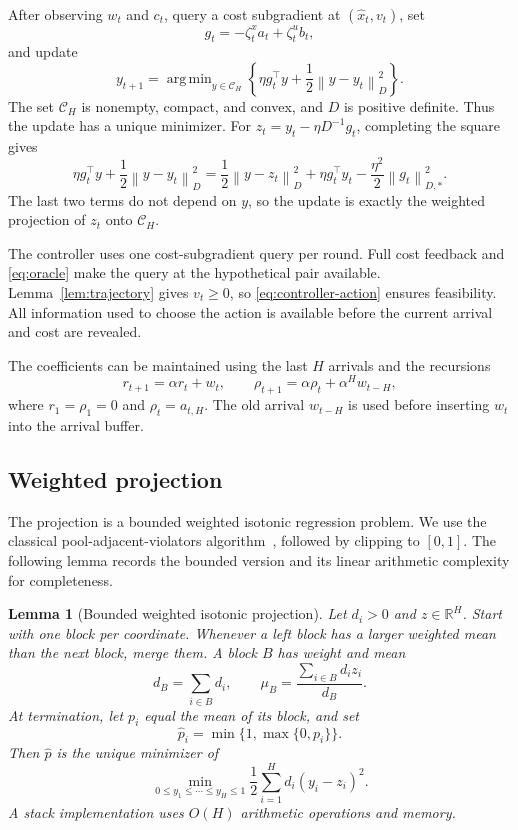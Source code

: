 \documentclass[11pt]{article}
\newtheorem{lemma}[theorem]{Lemma}
\newcommand{\R}{\mathbb R}
\newcommand{\CH}{\mathcal C_H}
\newcommand{\normD}[1]{\left\lVert #1\right\rVert_D}
\newcommand{\normDual}[1]{\left\lVert #1\right\rVert_{D,*}}
\DeclareMathOperator*{\argmin}{arg\,min}
\begin{document}
After observing $w_t$ and $c_t$, query a cost subgradient at
$(\widehat x_t,v_t)$, set
\[
g_t=-\zeta_t^x a_t+\zeta_t^u b_t,
\]
and update
\begin{equation}
\label{eq:update}
y_{t+1}
=
\argmin_{y\in\CH}
\left\{
\eta g_t^\top y+\frac12\normD{y-y_t}^2
\right\}.
\end{equation}
The set $\CH$ is nonempty, compact, and convex, and $D$ is
positive definite. Thus the update has a unique minimizer.
For $z_t=y_t-\eta D^{-1}g_t$, completing the square gives
\[
\eta g_t^\top y+\frac12\normD{y-y_t}^2
=\frac12\normD{y-z_t}^2
+\eta g_t^\top y_t-\frac{\eta^2}{2}\normDual{g_t}^2.
\]
The last two terms do not depend on $y$, so the update is
exactly the weighted projection of $z_t$ onto $\CH$.

The controller uses one cost-subgradient query per round.
Full cost feedback and \eqref{eq:oracle} make the query at the
hypothetical pair available.
Lemma~\ref{lem:trajectory} gives $v_t\ge0$, so
\eqref{eq:controller-action} ensures feasibility. All information
used to choose the action is available before the current
arrival and cost are revealed.

The coefficients can be maintained using the last $H$ arrivals
and the recursions
\begin{equation}
\label{eq:recursions}
r_{t+1}=\alpha r_t+w_t,
\qquad
\rho_{t+1}=\alpha\rho_t+\alpha^H w_{t-H},
\end{equation}
where $r_1=\rho_1=0$ and $\rho_t=a_{t,H}$.
The old arrival $w_{t-H}$ is used before inserting $w_t$ into
the arrival buffer.

\subsection{Weighted projection}

The projection is a bounded weighted isotonic regression problem.
We use the classical pool-adjacent-violators
algorithm~\cite{best1990isotonic}, followed by clipping to $[0,1]$.
The following lemma records the bounded version and its linear
arithmetic complexity for completeness.

\begin{lemma}[Bounded weighted isotonic projection]
\label{lem:projection}
Let $d_i>0$ and $z\in\R^H$. Start with one block per coordinate.
Whenever a left block has a larger weighted mean than the
next block, merge them. A block $B$ has weight and mean
\[
d_B=\sum_{i\in B}d_i,
\qquad
\mu_B=\frac{\sum_{i\in B}d_i z_i}{d_B}.
\]
At termination, let $p_i$ equal the mean of its block, and set
\[
\widehat p_i=\min\{1,\max\{0,p_i\}\}.
\]
Then $\widehat p$ is the unique minimizer of
\begin{equation}
\label{eq:projection}
\min_{0\le y_1\le\cdots\le y_H\le1}
\frac12\sum_{i=1}^H d_i(y_i-z_i)^2.
\end{equation}
A stack implementation uses $O(H)$ arithmetic operations and memory.
\end{lemma}
\end{document}
